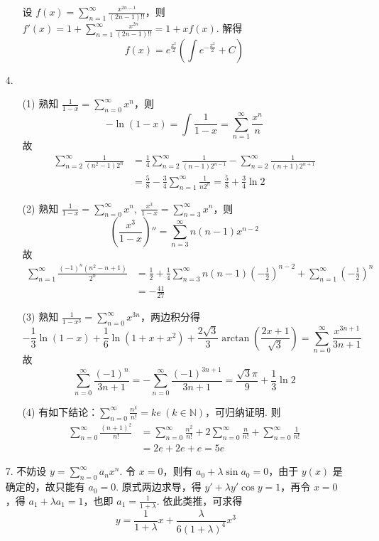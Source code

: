 \documentclass[11pt,oneside,fontset=fandol]{ctexbook} %
\begin{document}
\begin{enumerate}
\begin{enumerate}
        设 $f(x) = \sum_{n=1}^{\infty} \frac{x^{2n-1}}{(2n-1)!!}$，则 $f'(x) = 1 + \sum_{n=1}^{\infty} \frac{x^{2n}}{(2n-1)!!} = 1 + xf(x)$. 解得
        \[
            f(x) = e^{\frac {x^2} 2} \left( \int e^{-\frac {x^2} 2} + C \right)
        \]
    \end{enumerate}
    \item[4.]
    \begin{enumerate}
        \item[(1)]
        熟知 $\frac 1 {1-x} = \sum_{n=0}^{\infty} x^n$，则
        \[
            -\ln(1-x) = \int \frac 1 {1-x} = \sum_{n=1}^{\infty} \frac {x^n} n
        \]
        故
        \begin{align*}
            \sum_{n=2}^{\infty} \frac 1 {(n^2-1) 2^n} &= \frac 1 4 \sum_{n=2}^{\infty} \frac 1 {(n-1) 2^{n-1}} - \sum_{n=2}^{\infty} \frac 1 {(n+1) 2^{n+1}} \\
            &= \frac 5 8 - \frac 3 4 \sum_{n=1}^{\infty} \frac 1 {n 2^n} = \frac 5 8 + \frac 3 4 \ln 2
        \end{align*}
        \item[(2)]
        熟知 $\frac 1 {1-x} = \sum_{n=0}^{\infty} x^n,\ \frac{x^3}{1-x} = \sum_{n=3}^{\infty} x^n$，则
        \[
            \left( \frac{x^3}{1-x} \right)'' = \sum_{n=3}^{\infty} n(n-1) x^{n-2}
        \]
        故
        \begin{align*}
            \sum_{n=1}^{\infty} \frac{(-1)^n (n^2-n+1)}{2^n} &= \frac 1 2 + \frac 1 4 \sum_{n=3}^{\infty} n(n-1) \left( - \frac 1 2 \right)^{n-2} + \sum_{n=1}^{\infty} \left( -\frac 1 2 \right)^n \\
            &= - \frac{41}{27}
        \end{align*}
        \item[(3)]
        熟知 $\frac 1 {1-x^3} = \sum_{n=0}^{\infty} x^{3n}$，两边积分得
        \[
            -\frac 1 3 \ln(1-x) + \frac 1 6 \ln(1 + x + x^2) + \frac {2 \sqrt 3} 3 \arctan\left( \frac{2x + 1}{\sqrt 3} \right) = \sum_{n=0}^{\infty} \frac{x^{3n+1}}{3n+1}
        \]
        故
        \[
            \sum_{n=0}^{\infty} \frac{(-1)^n}{3n+1} = - \sum_{n=0}^{\infty} \frac{(-1)^{3n+1}}{3n+1} = \frac {\sqrt 3 \pi} 9 + \frac 1 3 \ln 2
        \]
        \item[(4)]
        有如下结论：$\sum_{n=0}^{\infty} \frac{n^k}{n!} = ke \ (k \in \mathbb N)$，可归纳证明. 则
        \begin{align*}
            \sum_{n=0}^{\infty} \frac{(n+1)^2}{n!} &= \sum_{n=0}^{\infty} \frac{n^2}{n!} + 2 \sum_{n=0}^{\infty} \frac n {n!} + \sum_{n=0}^{\infty} \frac 1 {n!} \\
            &= 2e + 2e + e = 5e
        \end{align*}
    \end{enumerate}
    \item[7.]
    不妨设 $y = \sum_{n=0}^{\infty} a_n x^n$. 令 $x = 0$，则有 $a_0 + \lambda \sin a_0 = 0$，由于 $y(x)$ 是确定的，故只能有 $a_0 = 0$. 原式两边求导，得 $y' + \lambda y' \cos y = 1$，再令 $x = 0$，得 $a_1 + \lambda a_1 = 1$，也即 $a_1 = \frac 1 {1+\lambda}$. 依此类推，可求得
    \[
        y = \frac 1 {1 + \lambda} x + \frac{\lambda}{6 (1 + \lambda)^4} x^3
    \]
\end{enumerate}
\end{document}

